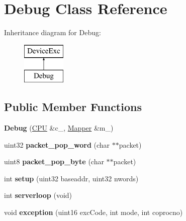 \hypertarget{classDebug}{
\section{Debug Class Reference}
\label{classDebug}
}
Inheritance diagram for Debug:\begin{figure}[H]
\begin{center}
\leavevmode
\includegraphics[height=2cm]{classDebug}
\end{center}
\end{figure}
\subsection*{Public Member Functions}
\begin{DoxyCompactItemize}
\item 
\hypertarget{classDebug_a83e8c791e1a70ecaeace305bacab1d04}{
{\bfseries Debug} (\hyperlink{classCPU}{CPU} \&c\_\-, \hyperlink{classMapper}{Mapper} \&m\_\-)}
\label{classDebug_a83e8c791e1a70ecaeace305bacab1d04}

\item 
\hypertarget{classDebug_aa5ea3bb7cd9cadd5274c72b7bbe164fa}{
uint32 {\bfseries packet\_\-pop\_\-word} (char $\ast$$\ast$packet)}
\label{classDebug_aa5ea3bb7cd9cadd5274c72b7bbe164fa}

\item 
\hypertarget{classDebug_ab409b4773599100bf80aeee6f0392291}{
uint8 {\bfseries packet\_\-pop\_\-byte} (char $\ast$$\ast$packet)}
\label{classDebug_ab409b4773599100bf80aeee6f0392291}

\item 
\hypertarget{classDebug_a3a757b15ce3133cd4bc5a503ae2b2439}{
int {\bfseries setup} (uint32 baseaddr, uint32 nwords)}
\label{classDebug_a3a757b15ce3133cd4bc5a503ae2b2439}

\item 
\hypertarget{classDebug_a015e24b9586e31f58fd51b5e0beffdd0}{
int {\bfseries serverloop} (void)}
\label{classDebug_a015e24b9586e31f58fd51b5e0beffdd0}

\item 
\hypertarget{classDebug_ac10c68e808b9198b2577e0d5c29a13ff}{
void {\bfseries exception} (uint16 excCode, int mode, int coprocno)}
\label{classDebug_ac10c68e808b9198b2577e0d5c29a13ff}

\end{DoxyCompactItemize}
